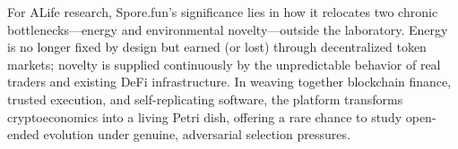 For ALife research, Spore.fun's significance lies in how it relocates two chronic bottlenecks—energy and environmental novelty—outside the laboratory. Energy is no longer fixed by design but earned (or lost) through decentralized token markets; novelty is supplied continuously by the unpredictable behavior of real traders and existing DeFi infrastructure. In weaving together blockchain finance, trusted execution, and self-replicating software, the platform transforms cryptoeconomics into a living Petri dish, offering a rare chance to study open-ended evolution under genuine, adversarial selection pressures.

